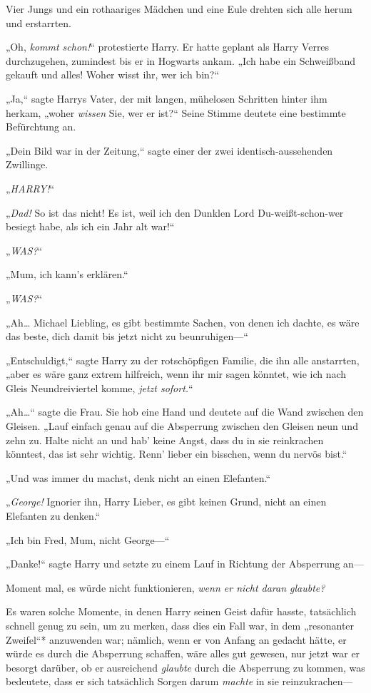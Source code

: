 {Vier Jungs und ein rothaariges Mädchen und eine Eule drehten sich alle herum und erstarrten.

„Oh, \emph{kommt schon!}“ protestierte Harry. Er hatte geplant als Harry Verres durchzugehen, zumindest bis er in Hogwarts ankam. „Ich habe ein Schweißband gekauft und alles! Woher wisst ihr, wer ich bin?“

„Ja,“ sagte Harrys Vater, der mit langen, mühelosen Schritten hinter ihm herkam, „woher \emph{wissen} Sie, wer er ist?“ Seine Stimme deutete eine bestimmte Befürchtung an.

„Dein Bild war in der Zeitung,“ sagte einer der zwei identisch-aussehenden Zwillinge.

„\emph{HARRY!}“

„\emph{Dad!} So ist das nicht! Es ist, weil ich den Dunklen Lord Du-weißt-schon-wer besiegt habe, als ich ein Jahr alt war!“

„\emph{WAS?}“

„Mum, ich kann's erklären.“

„\emph{WAS?}“

„Ah… Michael Liebling, es gibt bestimmte Sachen, von denen ich dachte, es wäre das beste, dich damit bis jetzt nicht zu beunruhigen—“

„Entschuldigt,“ sagte Harry zu der rotschöpfigen Familie, die ihn alle anstarrten, „aber es wäre ganz extrem hilfreich, wenn ihr mir sagen könntet, wie ich nach Gleis Neundreiviertel komme, \emph{jetzt sofort.}“

„Ah…“ sagte die Frau. Sie hob eine Hand und deutete auf die Wand zwischen den Gleisen. „Lauf einfach genau auf die Absperrung zwischen den Gleisen neun und zehn zu. Halte nicht an und hab' keine Angst, dass du in sie reinkrachen könntest, das ist sehr wichtig. Renn' lieber ein bisschen, wenn du nervös bist.“

„Und was immer du machst, denk nicht an einen Elefanten.“

„\emph{George!} Ignorier ihn, Harry Lieber, es gibt keinen Grund, nicht an einen Elefanten zu denken.“

„Ich bin Fred, Mum, nicht George—“

„Danke!“ sagte Harry und setzte zu einem Lauf in Richtung der Absperrung an—

Moment mal, es würde nicht funktionieren, \emph{wenn er nicht daran glaubte?}

Es waren solche Momente, in denen Harry seinen Geist dafür hasste, tatsächlich schnell genug zu sein, um zu merken, dass dies ein Fall war, in dem „resonanter Zweifel“* anzuwenden war; nämlich, wenn er von Anfang an gedacht hätte, er würde es durch die Absperrung schaffen, wäre alles gut gewesen, nur jetzt war er besorgt darüber, ob er ausreichend \emph{glaubte} durch die Absperrung zu kommen, was bedeutete, dass er sich tatsächlich Sorgen darum \emph{machte} in sie reinzukrachen—

}
